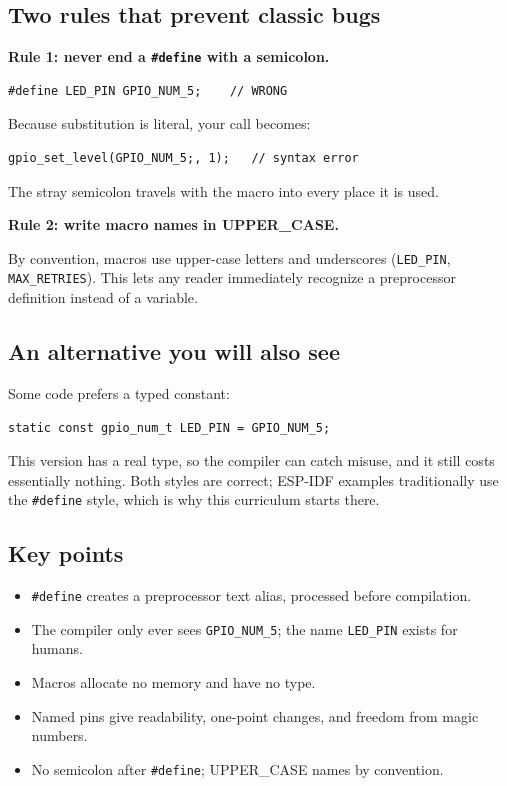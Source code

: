 \documentclass[11pt]{article}
\begin{document}
\subsection{Two rules that prevent classic bugs}

\textbf{Rule 1: never end a \texttt{\#define} with a semicolon.}

\begin{verbatim}
#define LED_PIN GPIO_NUM_5;    // WRONG
\end{verbatim}

Because substitution is literal, your call becomes:

\begin{verbatim}
gpio_set_level(GPIO_NUM_5;, 1);   // syntax error
\end{verbatim}

The stray semicolon travels with the macro into every place it is used.

\bigskip

\textbf{Rule 2: write macro names in UPPER\_CASE.}

By convention, macros use upper-case letters and underscores (\texttt{LED\_PIN}, \texttt{MAX\_RETRIES}). This lets any reader immediately recognize a preprocessor definition instead of a variable.

\subsection{An alternative you will also see}

Some code prefers a typed constant:

\begin{verbatim}
static const gpio_num_t LED_PIN = GPIO_NUM_5;
\end{verbatim}

This version has a real type, so the compiler can catch misuse, and it still costs essentially nothing. Both styles are correct; ESP-IDF examples traditionally use the \texttt{\#define} style, which is why this curriculum starts there.

\subsection{Key points}

\begin{itemize}
    \item \texttt{\#define} creates a preprocessor text alias, processed before compilation.
    \item The compiler only ever sees \texttt{GPIO\_NUM\_5}; the name \texttt{LED\_PIN} exists for humans.
    \item Macros allocate no memory and have no type.
    \item Named pins give readability, one-point changes, and freedom from magic numbers.
    \item No semicolon after \texttt{\#define}; UPPER\_CASE names by convention.
\end{itemize}
\end{document}
